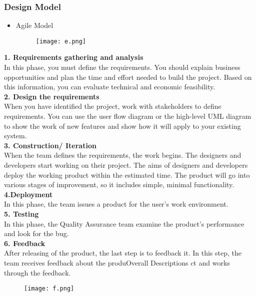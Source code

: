 \documentclass{article}
\begin{document}
\subsubsection{ Design Model}
\begin{itemize}
    \item Agile Model
     \begin{figure}[h]
            \centering
            \texttt{[image: e.png]}
        \end{figure}
\end{itemize}
\textbf{1. Requirements gathering and analysis}\\
In this phase, you must define the requirements. You should explain business opportunities and
plan the time and effort needed to build the project. Based on this information, you can evaluate
technical and economic feasibility.\\
\textbf{2. Design the requirements}\\
When you have identified the project, work with stakeholders to define requirements. You can
use the user flow diagram or the high-level UML diagram to show the work of new features and
show how it will apply to your existing system.\\
\textbf{3. Construction/ Iteration}\\
When the team defines the requirements, the work begins. The designers and developers start
working on their project. The aims of designers and developers deploy the working product within the estimated time. The product will go into various stages of improvement, so it includes
simple, minimal functionality.\\
\textbf{4.Deployment }\\
In this phase, the team issues a product for the user's work environment.\\
\textbf{5. Testing}\\
In this phase, the Quality Assurance team examine the product's performance and look for the
bug.\\
\textbf{6. Feedback}\\
After releasing of the product, the last step is to feedback it. In this step, the team receives
feedback about the produOverall Descriptions ct and works through the feedback. \\
\newpage


\begin{figure}[h]
            \centering
            \texttt{[image: f.png]}
        \end{figure}
\end{document}
